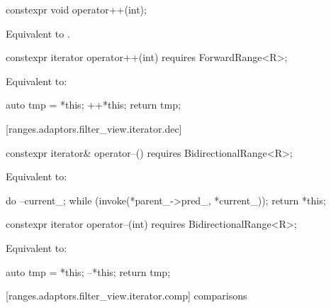 %
\begin{itemdecl}
constexpr void operator++(int);
\end{itemdecl}

\begin{itemdescr}
\pnum
\effects Equivalent to .
\end{itemdescr}

%
\begin{itemdecl}
constexpr iterator operator++(int) requires ForwardRange<R>;
\end{itemdecl}

\begin{itemdescr}
\pnum
\effects Equivalent to:
\begin{codeblock}
auto tmp = *this;
++*this;
return tmp;
\end{codeblock}
\end{itemdescr}

[ranges.adaptors.filter_view.iterator.dec]{}

%
\begin{itemdecl}
constexpr iterator& operator--() requires BidirectionalRange<R>;
\end{itemdecl}

\begin{itemdescr}
\pnum
\effects Equivalent to:
\begin{codeblock}
do
  --current_;
while (invoke(*parent_->pred_, *current_));
return *this;
\end{codeblock}
\end{itemdescr}

%
\begin{itemdecl}
constexpr iterator operator--(int) requires BidirectionalRange<R>;
\end{itemdecl}

\begin{itemdescr}
\pnum
\effects Equivalent to:
\begin{codeblock}
auto tmp = *this;
--*this;
return tmp;
\end{codeblock}
\end{itemdescr}

[ranges.adaptors.filter_view.iterator.comp]{ comparisons}

